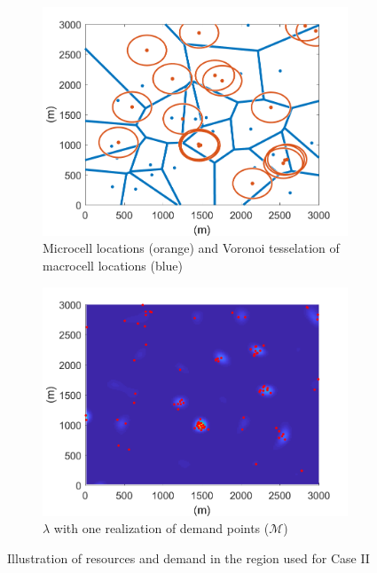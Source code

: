 \documentclass[12pt,dvipsnames]{report}
\begin{document}
\begin{figure}[htp]
	\centering
	\begin{subfigure}{.49\textwidth}
		\centering
		\includegraphics[width=1\linewidth]{Figures/CaseII_BSLocationsVoronoiCircles}
		\caption{\small Microcell locations (orange) and Voronoi tesselation of macrocell locations (blue)}
		\label{fig:CaseII_BSLocVor}
	\end{subfigure} \hfill
	\begin{subfigure}{.49\textwidth}
		\centering
		\includegraphics[width=1\linewidth]{Figures/CaseII_SSLTnsPPP_demandpointreal}
		\caption{\small $\lambda$ with one realization of demand points ($\mathcal{M}$)}
		\label{fig:CaseII_SSLTDPReal}
	\end{subfigure}
	\caption[Illustration of resources and demand used for Case II]{Illustration of resources and demand in the region used for Case II}
	\label{fig:CaseII_NetworkArea}
\end{figure}
\end{document}
